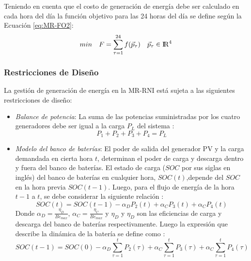 Teniendo en cuenta que el costo de generación de energía debe ser calculado en cada hora del día la función objetivo para las 24 horas del día se define según la Ecuación \ref{eq:MR-FO2}:
\begin{equation}\label{eq:MR-FO2}
 min\quad  F=
 \sum_{\tau=1}^{24}f(\vec{p}_\tau) \quad \vec{p}_\tau \in {\rm I\!R}^{4}
 \end{equation}
\subsubsection{Restricciones de Diseño}
La gestión de generación de energía en la MR-RNI está sujeta a las siguientes restricciones de diseño:
\begin{itemize}
\item \textit{Balance de potencia}: La suma de las potencias suministradas por los cuatro generadores debe ser igual a la carga $P_L$ del sistema :
 \begin{equation}
P_1+P_2+P_3+P_4=P_L
 \end{equation}
 \item \textit{Modelo del banco de baterías}: El poder de salida del generador PV y la carga demandada en cierta hora $t$, determinan el poder de carga y descarga dentro y fuera del banco de baterías.
El estado de carga ($SOC$ por sus siglas en inglés) del banco de baterías en cualquier hora, $SOC(t)$,depende del $SOC$ en la hora previa $SOC(t-1)$. Luego, para el flujo de energía de la hora $t-1$ a $t$, se debe considerar la siguiente relación \cite{tazvinga2013minimum}:
 \begin{equation}
SOC(t)=SOC(t-1)- \alpha_DP_2(t)+\alpha_CP_3(t)+\alpha_CP_4(t)
 \end{equation}
 Donde $\alpha_D=\frac{\eta_D}{Bc_{max}}$, $\alpha_C=\frac{\eta_C}{Bc_{max}}$ y $\eta_D$ y $\eta_D$ son las eficiencias de carga y descarga del banco de baterías respectivamente. Luego la expresión que describe la dinámica de la batería se define como \cite{tazvinga2013minimum}:
  \begin{equation}
SOC(t-1)=SOC(0)- \alpha_D \sum_{\tau=1}^{t}P_2(\tau)+\alpha_C\sum_{\tau=1}^{t}P_3(\tau)+\alpha_C \sum_{\tau=1}^{t}P_4(\tau)
 \end{equation}
 

\end{itemize}
